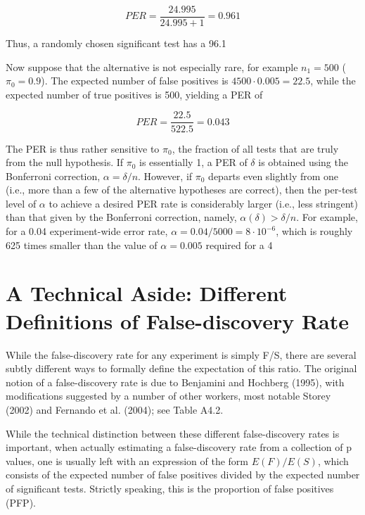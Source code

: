 \documentclass{article}
\begin{document}
\begin{equation}
PER=\frac{24.995}{24.995+1}=0.961
\end{equation}

Thus, a randomly chosen significant test has a 96.1%

Now suppose that the alternative is not especially rare, for example  $ n_1 = 500 $ ( $ \pi_0 = 0.9 $). The expected number of false positives is  $ 4500 \cdot 0.005 = 22.5 $, while the expected number of true positives is 500, yielding a PER of

\begin{equation}
PER=\frac{22.5}{522.5}=0.043
\end{equation}

The PER is thus rather sensitive to  $ \pi_0 $, the fraction of all tests that are truly from the null hypothesis. If  $ \pi_0 $ is essentially 1, a PER of  $ \delta $ is obtained using the Bonferroni correction,  $ \alpha = \delta/n $. However, if  $ \pi_0 $ departs even slightly from one (i.e., more than a few of the alternative hypotheses are correct), then the per-test level of  $ \alpha $ to achieve a desired PER rate is considerably larger (i.e., less stringent) than that given by the Bonferroni correction, namely,  $ \alpha(\delta) > \delta/n $. For example, for a 0.04 experiment-wide error rate,  $ \alpha = 0.04/5000 = 8 \cdot 10^{-6} $, which is roughly 625 times smaller than the value of  $ \alpha = 0.005 $ required for a 4%

\section{A Technical Aside: Different Definitions of False-discovery Rate}
While the false-discovery rate for any experiment is simply F/S, there are several subtly different ways to formally define the expectation of this ratio. The original notion of a false-discovery rate is due to Benjamini and Hochberg (1995), with modifications suggested by a number of other workers, most notable Storey (2002) and Fernando et al. (2004); see Table A4.2.

While the technical distinction between these different false-discovery rates is important, when actually estimating a false-discovery rate from a collection of p values, one is usually left with an expression of the form  $ E(F)/E(S) $, which consists of the expected number of false positives divided by the expected number of significant tests. Strictly speaking, this is the proportion of false positives (PFP).
\end{document}
